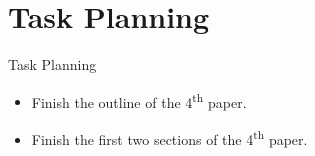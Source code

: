 
\section{Task Planning}
\begin{frame}{Task Planning}
    \begin{itemize}
      \item Finish the outline of the 4\textsuperscript{th} paper.
      \item Finish the first two sections of the 4\textsuperscript{th} paper.
    \end{itemize}
\end{frame} 